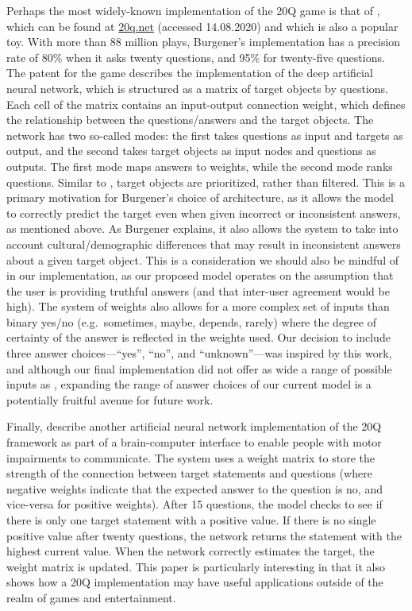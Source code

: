 \documentclass[11pt,a4paper]{article}
\begin{document}
Perhaps the most widely-known implementation of the 20Q game is that of \citet{Burgener2006}, which can be found at \url{20q.net} (accessed 14.08.2020) and which is also a popular toy. 
With more than 88 million plays, Burgener's implementation has a precision rate of 80\% when it asks twenty questions, and 95\% for twenty-five questions. 
The patent for the game describes the implementation of the deep artificial neural network, which is structured as a matrix of target objects by questions. 
Each cell of the matrix contains an input-output connection weight, which defines the relationship between the questions/answers and the target objects. 
The network has two so-called modes: the first takes questions as input and targets as output, and the second takes target objects as input nodes and questions as outputs. 
The first mode maps answers to weights, while the second mode ranks questions. 
Similar to \citet{DeyEa2019}, target objects are prioritized, rather than filtered. 
This is a primary motivation for Burgener's choice of architecture, as it allows the model to correctly predict the target even when given incorrect or inconsistent answers, as mentioned above. 
As Burgener explains, it also allows the system to take into account cultural/demographic differences that may result in inconsistent answers about a given target object. 
This is a consideration we should also be mindful of in our implementation, as our proposed model operates on the assumption that the user is providing truthful answers (and that inter-user agreement would be high). 
The system of weights also allows for a more complex set of inputs than binary yes/no (e.g.\ sometimes, maybe, depends, rarely) where the degree of certainty of the answer is reflected in the weights used. 
Our decision to include three answer choices---``yes'', ``no'', and ``unknown''---was inspired by this work, and although our final implementation did not offer as wide a range of possible inputs as \citet{Burgener2006}, expanding the range of answer choices of our current model is a potentially fruitful avenue for future work.

Finally, \citet{ToninEa2018} describe another artificial neural network implementation of the 20Q framework as part of a brain-computer interface to enable people with motor impairments to communicate. 
The system uses a weight matrix to store the strength of the connection between target statements and questions (where negative weights indicate that the expected answer to the question is no, and vice-versa for positive weights). 
After 15 questions, the model checks to see if there is only one target statement with a positive value. 
If there is no single positive value after twenty questions, the network returns the statement with the highest current value. 
When the network correctly estimates the target, the weight matrix is updated. 
This paper is particularly interesting in that it also shows how a 20Q implementation may have useful applications outside of the realm of games and entertainment.
\end{document}
